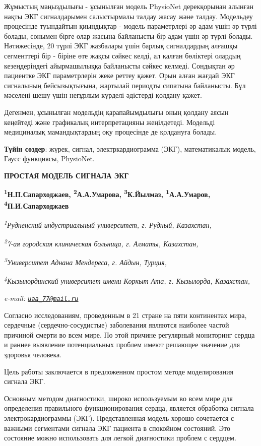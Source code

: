 {Жұмыстың маңыздылығы - ұсынылған модель PhysioNet дерекқорынан алынған
нақты ЭКГ сигналдарымен салыстырмалы талдау жасау және талдау. Модельдеу
процесінде туындайтын қиындықтар - модель параметрлері әр адам үшін әр
түрлі болады, сонымен бірге олар жасына байланысты бір адам үшін әр
түрлі болады. Нәтижесінде, 20 түрлі ЭКГ жазбалары үшін барлық
сигналдардың алғашқы сегменттері бір - біріне өте жақсы сәйкес келді, ал
қалған бөліктері олардың кезеңдеріндегі айырмашылыққа байланысты сәйкес
келмеді. Сондықтан әр пациентке ЭКГ параметрлерін жеке реттеу қажет.
Орын алған жағдай ЭКГ сигналының бейсызықтығына, жартылай периодты
сипатына байланысты. Бұл мәселені шешу үшін неғұрлым күрделі әдістерді
қолдану қажет.

Дегенмен, ұсынылған модельдің қарапайымдылығы оның қолдану аясын
кеңейтеді және графикалық интерпретацияны жеңілдетеді. Модельді
медициналық мамандықтардың оқу процесінде де қолдануға болады.

{\bfseries Түйін сөздер}: жүрек, сигнал, электркардиограмма (ЭКГ),
математикалық модель, Гаусс функциясы, PhysioNet.

{\bfseries ПРОСТАЯ МОДЕЛЬ СИГНАЛА ЭКГ}

{\bfseries \textsuperscript{1}Н.П.Сапарходжаев,
\textsuperscript{2}А.А.Умарова, \textsuperscript{3}К.Йылмаз,
\textsuperscript{1}А.А.Умаров, \textsuperscript{4}П.И.Сапарходжаев}

\emph{\textsuperscript{1}Рудненский индустриальный университет, г.
Рудный, Казахстан,}

\emph{\textsuperscript{2}7-ая городская клиническая больница, г. Алматы,
Казахстан,}

\emph{\textsuperscript{3}Университет Аднана Мендереса, г. Айдын,
Турция,}

\emph{\textsuperscript{4}Кызылординский университет имени Коркыт Ата, г.
Кызылорда, Казахстан,}

\emph{e-mail: \href{mailto:uaa_77@mail.ru}{\nolinkurl{uaa\_77@mail.ru}}}

Согласно исследованиям, проведенным в 21 стране на пяти континентах
мира, сердечные (сердечно-сосудистые) заболевания являются наиболее
частой причиной смерти во всем мире. По этой причине регулярный
мониторинг сердца и раннее выявление потенциальных проблем имеют
решающее значение для здоровья человека.

Цель работы заключается в предложенном простом методе моделирования
сигнала ЭКГ.

Основным методом диагностики, широко используемым во всем мире для
определения правильного функционирования сердца, является обработка
сигнала электрокардиограммы (ЭКГ). Представленная модель хорошо
сочетается с важными сегментами сигнала ЭКГ пациента в спокойном
состояний. Это состояние можно использовать для легкой диагностики
проблем с сердцем.

}
